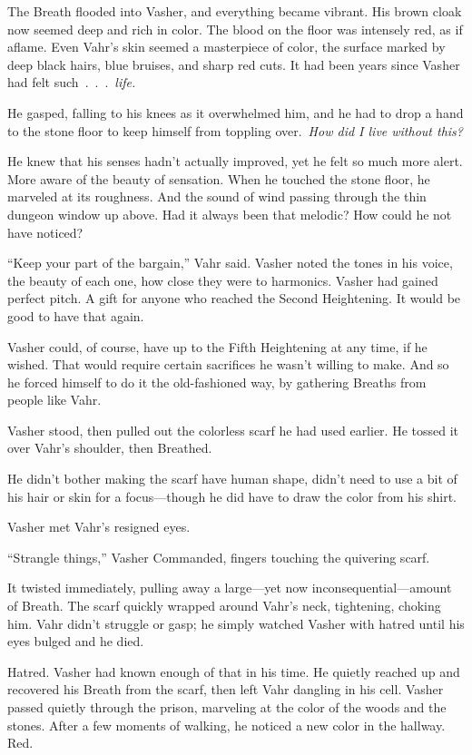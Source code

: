 The Breath flooded into Vasher, and everything became vibrant. His brown cloak now seemed deep and rich in color. The blood on the floor was intensely red, as if aflame. Even Vahr’s skin seemed a masterpiece of color, the surface marked by deep black hairs, blue bruises, and sharp red cuts. It had been years since Vasher had felt such~.~.~.~\textit{life.}

He gasped, falling to his knees as it overwhelmed him, and he had to drop a hand to the stone floor to keep himself from toppling over.~\textit{How did I live without this?}

He knew that his senses hadn’t actually improved, yet he felt so much more alert. More aware of the beauty of sensation. When he touched the stone floor, he marveled at its roughness. And the sound of wind passing through the thin dungeon window up above. Had it always been that melodic? How could he not have noticed?

“Keep your part of the bargain,” Vahr said. Vasher noted the tones in his voice, the beauty of each one, how close they were to harmonics. Vasher had gained perfect pitch. A gift for anyone who reached the Second Heightening. It would be good to have that again.

Vasher could, of course, have up to the Fifth Heightening at any time, if he wished. That would require certain sacrifices he wasn’t willing to make. And so he forced himself to do it the old-fashioned way, by gathering Breaths from people like Vahr.

Vasher stood, then pulled out the colorless scarf he had used earlier. He tossed it over Vahr’s shoulder, then Breathed.

He didn’t bother making the scarf have human shape, didn’t need to use a bit of his hair or skin for a focus—though he did have to draw the color from his shirt.

Vasher met Vahr’s resigned eyes.

“Strangle things,” Vasher Commanded, fingers touching the quivering scarf.

It twisted immediately, pulling away a large—yet now inconsequential—amount of Breath. The scarf quickly wrapped around Vahr’s neck, tightening, choking him. Vahr didn’t struggle or gasp; he simply watched Vasher with hatred until his eyes bulged and he died.

Hatred. Vasher had known enough of that in his time. He quietly reached up and recovered his Breath from the scarf, then left Vahr dangling in his cell. Vasher passed quietly through the prison, marveling at the color of the woods and the stones. After a few moments of walking, he noticed a new color in the hallway. Red.

